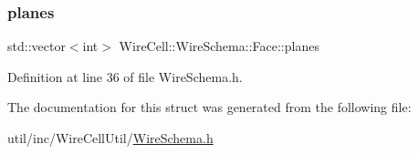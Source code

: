 \mbox{\label{struct_wire_cell_1_1_wire_schema_1_1_face_a62be3bcb043b68771e0bd5b6e4fc2607}} 
\subsubsection{\texorpdfstring{planes}{planes}}
{\footnotesize\ttfamily std\+::vector$<$int$>$ Wire\+Cell\+::\+Wire\+Schema\+::\+Face\+::planes}



Definition at line 36 of file Wire\+Schema.\+h.



The documentation for this struct was generated from the following file\+:\begin{DoxyCompactItemize}
\item 
util/inc/\+Wire\+Cell\+Util/\hyperlink{_wire_schema_8h}{Wire\+Schema.\+h}\end{DoxyCompactItemize}
